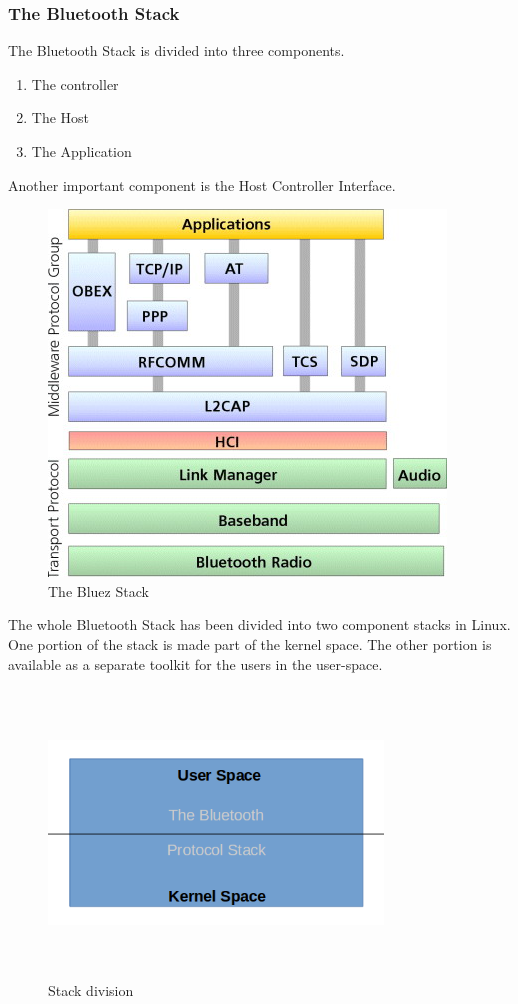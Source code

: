 \subsubsection{The Bluetooth Stack}
The Bluetooth Stack is divided into three components.
\begin{enumerate}
	\item The controller
	\item The Host
	\item The Application
\end{enumerate}
Another important component is the Host Controller Interface.
\begin{figure}[ht]
	\centering
	\includegraphics[scale=0.5]{images/bluetooth_stack.png}
	\caption{The Bluez Stack}
\end{figure}
The whole Bluetooth Stack has been divided into two component stacks in Linux. One portion of the stack is made part of the kernel space. The other portion is available as a separate toolkit for the users in the user-space.
\begin{figure}[ht]
	\centering
	\includegraphics[width=3.5in, height=3in]{images/kernel_userspace.png}
	\caption{Stack division}
\end{figure}
